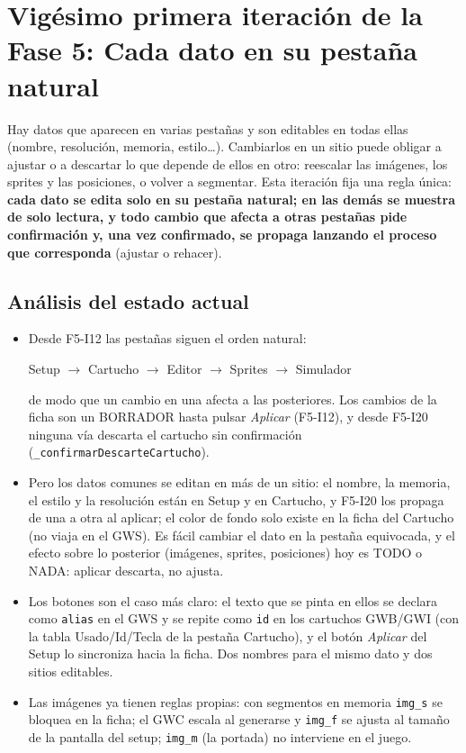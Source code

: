 \section{Vigésimo primera iteración de la Fase 5: Cada dato en su pestaña natural}
\label{sec:F5I21}

Hay datos que aparecen en varias pestañas y son editables en todas ellas (nombre, resolución, memoria, estilo\ldots). Cambiarlos en un sitio puede obligar a ajustar o a descartar lo que depende de ellos en otro: reescalar las imágenes, los sprites y las posiciones, o volver a segmentar. Esta iteración fija una regla única: \textbf{cada dato se edita solo en su pestaña natural; en las demás se muestra de solo lectura, y todo cambio que afecta a otras pestañas pide confirmación y, una vez confirmado, se propaga lanzando el proceso que corresponda} (ajustar o rehacer).

\subsection{Análisis del estado actual}
\label{sec:F5I21Analisis}

\begin{itemize}
	\item Desde F5-I12 las pestañas siguen el orden natural:
	\begin{center}
		Setup $\to$ Cartucho $\to$ Editor $\to$ Sprites $\to$ Simulador
	\end{center}
	de modo que un cambio en una afecta a las posteriores. Los cambios de la ficha son un BORRADOR hasta pulsar \emph{Aplicar} (F5-I12), y desde F5-I20 ninguna vía descarta el cartucho sin confirmación (\texttt{\_confirmarDescarteCartucho}).
	
	\item Pero los datos comunes se editan en más de un sitio: el nombre, la memoria, el estilo y la resolución están en  Setup y en Cartucho, y F5-I20 los propaga de una a otra al aplicar; el color de fondo solo existe en la ficha del Cartucho (no viaja en el GWS). Es fácil cambiar el dato en la pestaña equivocada, y el efecto sobre lo posterior (imágenes, sprites, posiciones) hoy es TODO o NADA: aplicar descarta, no ajusta.

	\item Los botones son el caso más claro: el texto que se pinta en ellos se declara como \texttt{alias} en el GWS y se repite como \texttt{id} en los cartuchos GWB/GWI (con la tabla Usado/Id/Tecla de la pestaña Cartucho), y el botón \emph{Aplicar} del Setup lo sincroniza hacia la ficha. Dos nombres para el mismo dato y dos sitios editables.

	\item Las imágenes ya tienen reglas propias: con segmentos en memoria \texttt{img\_s} se bloquea en la ficha; el GWC escala al generarse y \texttt{img\_f} se ajusta al tamaño de la pantalla del setup; \texttt{img\_m} (la portada) no interviene en el juego.
\end{itemize}

